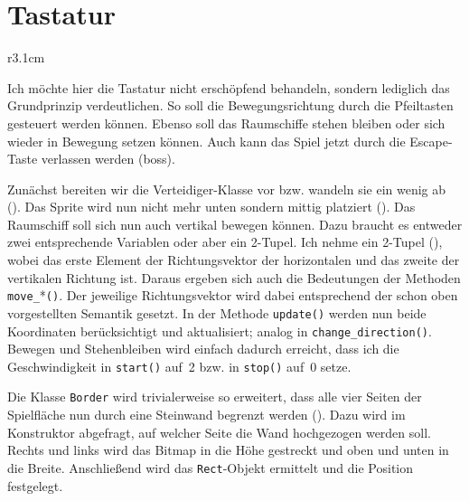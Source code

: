 \section{Tastatur}

\begin{wrapfigure}[10]{r}{3.1cm}%
	\begin{center}%
		\vspace{-1cm}%
	\end{center}%
\end{wrapfigure}%
Ich möchte hier die Tastatur nicht erschöpfend behandeln, sondern lediglich das Grundprinzip verdeutlichen. So soll die Bewegungsrichtung durch die Pfeiltasten gesteuert werden können. Ebenso soll das Raumschiffe stehen bleiben oder sich wieder in Bewegung setzen können. Auch kann das Spiel jetzt durch die Escape-Taste verlassen werden (\Gls{boss}).

Zunächst bereiten wir die Verteidiger-Klasse vor bzw. wandeln sie ein wenig ab (). Das Sprite wird nun nicht mehr unten sondern mittig platziert (). Das Raumschiff soll sich nun auch vertikal bewegen können. Dazu braucht es entweder zwei entsprechende Variablen oder aber ein 2-Tupel. Ich nehme ein 2-Tupel (), wobei das erste Element der Richtungsvektor der horizontalen und das zweite der vertikalen Richtung ist. Daraus ergeben sich auch die Bedeutungen der Methoden \texttt{move\_}*\texttt{()}. Der jeweilige Richtungsvektor wird dabei entsprechend der schon oben vorgestellten Semantik gesetzt. In der Methode \texttt{update()} werden nun beide Koordinaten berücksichtigt und aktualisiert; analog in \texttt{change\_direction()}. Bewegen und Stehenbleiben wird einfach dadurch erreicht, dass ich die Geschwindigkeit in \texttt{start()} auf~2 bzw. in \texttt{stop()} auf~0 setze.


Die Klasse \texttt{Border} wird trivialerweise so erweitert, dass alle vier Seiten der Spielfläche nun durch eine Steinwand begrenzt werden (). Dazu wird im Konstruktor abgefragt, auf welcher Seite die Wand hochgezogen werden soll. Rechts und links wird das Bitmap in die Höhe gestreckt und oben und unten in die Breite. Anschließend wird das \texttt{Rect}-Objekt ermittelt und die Position festgelegt.


